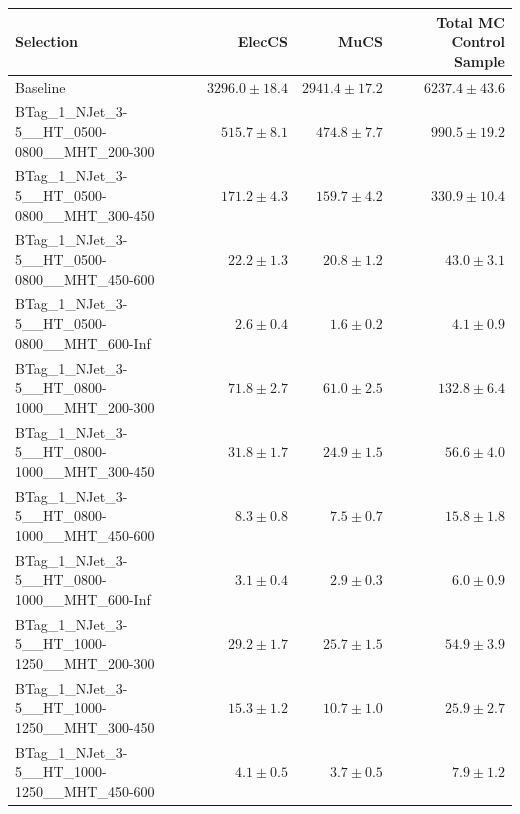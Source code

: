 \documentclass{beamer}
\begin{document}
\begin{frame}
\tiny
\begin{tabular}{lrrr}
\toprule

                                                Selection  &                   ElecCS  &                     MuCS  &          Total MC Control Sample  \\ 
\midrule
                                             Baseline &           $3296.0\pm18.4$&           $2941.4\pm17.2$&               $6237.4\pm43.6$ \\ 
      BTag\_1\_NJet\_3-5\_\_HT\_0500-0800\_\_MHT\_200-300 &             $515.7\pm8.1$&             $474.8\pm7.7$&                $990.5\pm19.2$ \\ 
      BTag\_1\_NJet\_3-5\_\_HT\_0500-0800\_\_MHT\_300-450 &             $171.2\pm4.3$&             $159.7\pm4.2$&                $330.9\pm10.4$ \\ 
      BTag\_1\_NJet\_3-5\_\_HT\_0500-0800\_\_MHT\_450-600 &              $22.2\pm1.3$&              $20.8\pm1.2$&                  $43.0\pm3.1$ \\ 
      BTag\_1\_NJet\_3-5\_\_HT\_0500-0800\_\_MHT\_600-Inf &               $2.6\pm0.4$&               $1.6\pm0.2$&                   $4.1\pm0.9$ \\ 
      BTag\_1\_NJet\_3-5\_\_HT\_0800-1000\_\_MHT\_200-300 &              $71.8\pm2.7$&              $61.0\pm2.5$&                 $132.8\pm6.4$ \\ 
      BTag\_1\_NJet\_3-5\_\_HT\_0800-1000\_\_MHT\_300-450 &              $31.8\pm1.7$&              $24.9\pm1.5$&                  $56.6\pm4.0$ \\ 
      BTag\_1\_NJet\_3-5\_\_HT\_0800-1000\_\_MHT\_450-600 &               $8.3\pm0.8$&               $7.5\pm0.7$&                  $15.8\pm1.8$ \\ 
      BTag\_1\_NJet\_3-5\_\_HT\_0800-1000\_\_MHT\_600-Inf &               $3.1\pm0.4$&               $2.9\pm0.3$&                   $6.0\pm0.9$ \\ 
      BTag\_1\_NJet\_3-5\_\_HT\_1000-1250\_\_MHT\_200-300 &              $29.2\pm1.7$&              $25.7\pm1.5$&                  $54.9\pm3.9$ \\ 
      BTag\_1\_NJet\_3-5\_\_HT\_1000-1250\_\_MHT\_300-450 &              $15.3\pm1.2$&              $10.7\pm1.0$&                  $25.9\pm2.7$ \\ 
      BTag\_1\_NJet\_3-5\_\_HT\_1000-1250\_\_MHT\_450-600 &               $4.1\pm0.5$&               $3.7\pm0.5$&                   $7.9\pm1.2$ \\ 

\end{tabular}
\end{frame}
\end{document}
